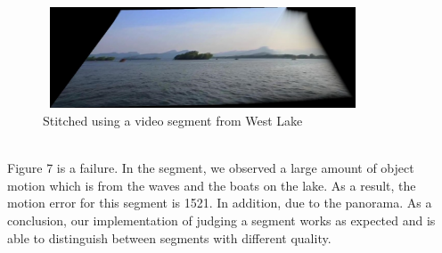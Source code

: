 \documentclass[12pt]{article}
\begin{document}
\begin{figure}[h]
	\centering
	\includegraphics[width=9.5cm, height=3cm]{lakeError1206-1310}
	\caption{Stitched using a video segment from West Lake}
\end{figure}\\
Figure 7 is a failure. In the segment, we observed a large amount of object motion which is from the waves and the boats on the lake. As a result, the motion error for this segment is 1521. In addition, due to the panorama. 
As a conclusion, our implementation of judging a segment works as expected and is able to distinguish between segments with different quality.
\end{document}
